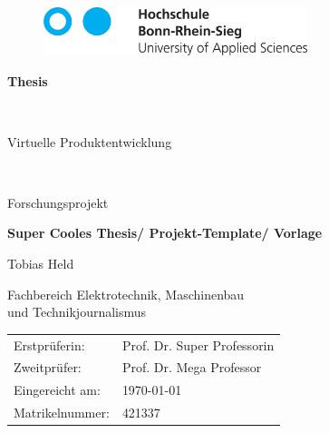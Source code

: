 \begin{titlepage}
	\begin{figure}[htbp]
		\includegraphics[height=1.4cm]{Kapitel/xx_Logo_HBRS_74mm_Pfade-eps-converted-to.pdf}
	\end{figure}
  \linespread{1.4}%
  \vspace{2cm}
  \begin{center}

    \begin{Huge}\textbf{Thesis}\end{Huge} \\
    \vspace{1cm}
    \begin{Large}{Virtuelle Produktentwicklung}\end{Large} \\
    \begin{large}
    	Forschungsprojekt
    \end{large}

    \vspace{0.7cm}
    \linespread{1.2}%
    \begin{huge}
      \textbf{Super Cooles Thesis/ Projekt-Template/ Vorlage}
    \end{huge}
    \linespread{1.5}%
    \normalsize
    \vspace{1cm}%

    \begin{Large}{Tobias Held \\}
    \end{Large}

    \begin{Large}%
        Fachbereich Elektrotechnik, Maschinenbau \\ und Technikjournalismus
    \end{Large}
  \end{center}

  \vfill

  \begin{large}
    {
      \begin{tabular}{ll}
      Erstprüferin:  & Prof. Dr. Super Professorin \\
      Zweitprüfer: & Prof. Dr. Mega Professor \\
      Eingereicht am: & \today \\%
      Matrikelnummer: & 421337
      \end{tabular}
	}
  \end{large}

\end{titlepage}
